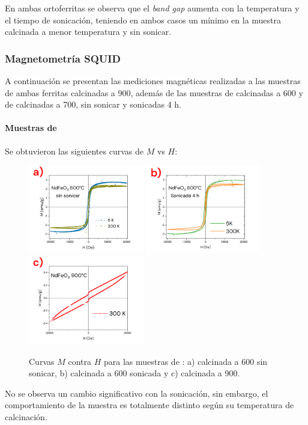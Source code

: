 \documentclass[../main.tex]{subfiles}
\begin{document}
En ambas ortoferritas se observa que el \textit{band gap} aumenta con la temperatura y el tiempo de sonicación, teniendo en ambos casos un mínimo en la muestra calcinada a menor temperatura y sin sonicar.
\subsubsection{Magnetometría SQUID}
A continuación se presentan las mediciones magnéticas realizadas a las muestras de ambas ferritas calcinadas a 900\gradoC{}, además de las muestras de \neod{} calcinadas a 600\gradoC{} y de \sama{} calcinadas a 700\gradoC{}, sin sonicar y sonicadas 4 h.
\paragraph{Muestras de \neod{}}
Se obtuvieron las siguientes curvas de $M$ vs $H$:
\begin{figure}[H]
    \centering
    \includegraphics[width=0.45\textwidth]{fig/mvhNd.png}
    \quad
    \includegraphics[width=0.45\textwidth]{fig/mvhNd-S.png}
    \includegraphics[width=0.45\textwidth]{fig/mvhNd900.png}
    \caption{Curvas $M$ contra $H$ para las muestras de \neod{}: a) calcinada a 600\gradoC{} sin sonicar, b) calcinada a 600\gradoC{} sonicada y c) calcinada a 900\gradoC{}.}
    \label{fig:mvhNd}
\end{figure}
No se observa un cambio significativo con la sonicación, sin embargo, el comportamiento de la muestra es totalmente distinto según su temperatura de calcinación.
\end{document}
